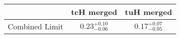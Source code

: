 \centering
\begin{tabular}{|c|c|c|} \hline
 & tcH merged & tuH merged\\\hline
Combined Limit & $0.23^{+0.10}_{-0.06}$ & $0.17^{+0.07}_{-0.05}$\\\hline
\end{tabular}
